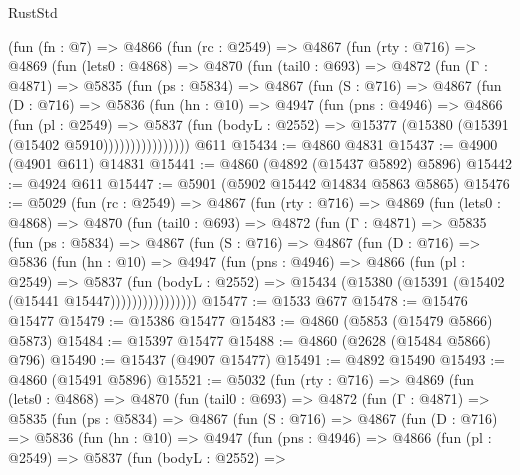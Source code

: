 \begin{lexlean}{RustStd}
\begin{coremodule}
    (fun (fn : @7) =>
    @4866
      (fun (rc : @2549) =>
      @4867
        (fun (rty : @716) =>
        @4869
          (fun (lets0 : @4868) =>
          @4870
            (fun (tail0 : @693) =>
            @4872
              (fun (Γ : @4871) =>
              @5835
                (fun (ps : @5834) =>
                @4867
                  (fun (S : @716) =>
                  @4867
                    (fun (D : @716) =>
                    @5836
                      (fun (hn : @10) =>
                      @4947
                        (fun (pns : @4946) =>
                        @4866
                          (fun (pl : @2549) =>
                          @5837
                            (fun (bodyL : @2552) =>
                            @15377 (@15380 (@15391 (@15402 @5910))))))))))))))))
    @611
@15434 := @4860 @4831
@15437 := @4900 (@4901 @611) @14831
@15441 := @4860 (@4892 (@15437 @5892) @5896)
@15442 := @4924 @611
@15447 := @5901 (@5902 @15442 @14834 @5863 @5865)
@15476 := @5029
    (fun (rc : @2549) =>
    @4867
      (fun (rty : @716) =>
      @4869
        (fun (lets0 : @4868) =>
        @4870
          (fun (tail0 : @693) =>
          @4872
            (fun (Γ : @4871) =>
            @5835
              (fun (ps : @5834) =>
              @4867
                (fun (S : @716) =>
                @4867
                  (fun (D : @716) =>
                  @5836
                    (fun (hn : @10) =>
                    @4947
                      (fun (pns : @4946) =>
                      @4866
                        (fun (pl : @2549) =>
                        @5837
                          (fun (bodyL : @2552) =>
                          @15434 (@15380 (@15391 (@15402 (@15441 @15447))))))))))))))))
@15477 := @1533 @677
@15478 := @15476 @15477
@15479 := @15386 @15477
@15483 := @4860 (@5853 (@15479 @5866) @5873)
@15484 := @15397 @15477
@15488 := @4860 (@2628 (@15484 @5866) @796)
@15490 := @15437 (@4907 @15477)
@15491 := @4892 @15490
@15493 := @4860 (@15491 @5896)
@15521 := @5032
    (fun (rty : @716) =>
    @4869
      (fun (lets0 : @4868) =>
      @4870
        (fun (tail0 : @693) =>
        @4872
          (fun (Γ : @4871) =>
          @5835
            (fun (ps : @5834) =>
            @4867
              (fun (S : @716) =>
              @4867
                (fun (D : @716) =>
                @5836
                  (fun (hn : @10) =>
                  @4947
                    (fun (pns : @4946) =>
                    @4866
                      (fun (pl : @2549) =>
                      @5837
                        (fun (bodyL : @2552) =>

\end{coremodule}
\end{lexlean}
